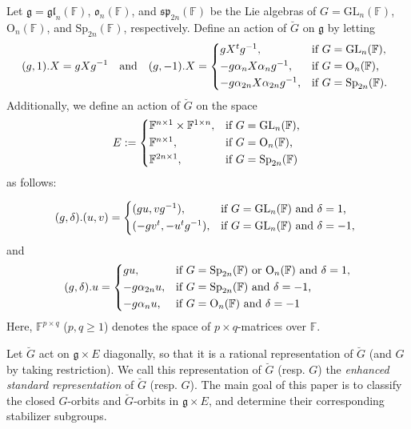 \documentclass[12pt]{amsart}
\theoremstyle{definition}
\theoremstyle{remark}\newtheorem{rmk}[lm]{Remark}
\newcommand{\RO}{{\mathrm {O}}}
\newcommand{\GL}{{\mathrm{GL}}}
\newcommand{\Sp}{{\mathrm{Sp}}}
\newcommand{\g}{\mathfrak g}
\newcommand{\C}{\mathbb{F}}
\begin{document}
            
	Let $\g=\mathfrak{gl}_n(\C)$, $\mathfrak{o}_n(\C)$, and $\mathfrak{sp}_{2n}(\C)$  be the Lie algebras of $G=\GL_n(\C)$, $\RO_n(\C)$, and $\Sp_{2n}(\C)$, respectively. Define an action of $\breve{G}$ on $\g$ by letting 
    \begin{equation*}
    (g,1).X=gXg^{-1}\quad \text{and}\quad    (g,-1).X=\begin{cases*}
            gX^tg^{-1},&if $G=\GL_n(\C)$,\\
            -g\alpha_{n}X\alpha_{n}g^{-1},&if $G=\RO_n(\C)$,\\
            -g\alpha_{2n}X\alpha_{2n}g^{-1},&if $G=\Sp_{2n}(\C)$.
        \end{cases*}
    \end{equation*}
   Additionally, we define an action of $\breve{G}$ on  the space 
	\begin{equation*}
		E:=\begin{cases*}
			\C^{n\times 1}\times \C^{1\times n},&if $G=\GL_n(\C)$,\\
			\C^{n\times 1},&if $G=\RO_n(\C)$,\\
            \C^{2n\times 1}, &if $G=\Sp_{2n}(\C)$
		\end{cases*}
	\end{equation*}
as follows: 

\begin{equation*}
    (g,\delta).(u,v)=\begin{cases*}
        (gu,vg^{-1}),&if $G=\GL_n(\C)$ and $\delta=1$,\\
        (-gv^t,-u^tg^{-1}),&if $G=\GL_n(\C)$ and $\delta=-1$,
    \end{cases*}
\end{equation*}
and
\begin{equation*}
    (g,\delta).u=\begin{cases*}
        gu,&if $G=\Sp_{2n}(\C)$ or $\RO_n(\C)$ and $\delta=1$,\\
        -g\alpha_{2n}u,&if $G=\Sp_{2n}(\C)$ and $\delta=-1$,\\
        -g\alpha_nu,&if $G=\RO_n(\C)$ and $\delta=-1$
    \end{cases*}
\end{equation*}
    Here, $\C^{p\times q}$ ($p,q\ge 1$) denotes the space of $p\times q$-matrices over $\C$. 
     
	Let $\breve{G}$ act on $\g\times E$ diagonally, so that it is a rational representation of $\breve{G}$ (and $G$ by taking restriction). 
    We call this representation of $\breve{G}$ (resp. $G$) the \emph{enhanced standard representation} of $\breve{G}$ (resp. $G$). 
 The main goal of this paper is to classify the closed $G$-orbits and $\breve{G}$-orbits in  $\g\times E$, and determine their corresponding stabilizer subgroups.
\end{document}
